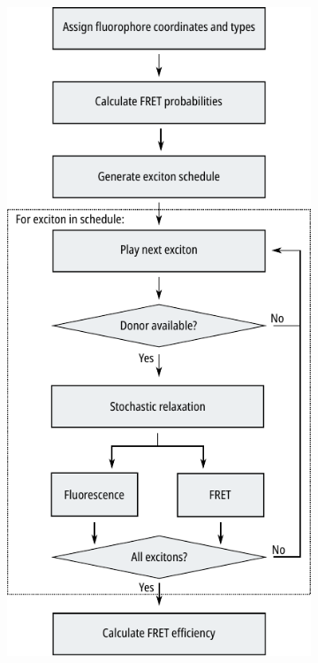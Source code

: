 \begin{figure}[h]
\begin{minipage}{0.35\textwidth}
\begin{subfigure}[t]{\textwidth}
		\includegraphics[width=\textwidth]{exifret_program.pdf}
	\end{subfigure}

\end{minipage}
\end{figure}
